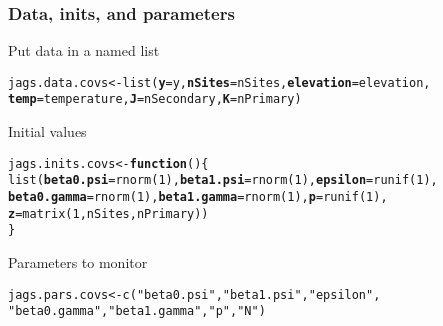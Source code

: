 \documentclass[color=usenames,dvipsnames]{beamer}\usepackage[]{graphicx}\usepackage[]{color}
\makeatletter
\newcommand{\hlnum}[1]{\textcolor[rgb]{0.69,0.494,0}{#1}}%
\newcommand{\hlstr}[1]{\textcolor[rgb]{0.749,0.012,0.012}{#1}}%
\newcommand{\hlstd}[1]{\textcolor[rgb]{0,0,0}{#1}}%
\newcommand{\hlkwa}[1]{\textcolor[rgb]{0,0,0}{\textbf{#1}}}%
\newcommand{\hlkwb}[1]{\textcolor[rgb]{0,0.341,0.682}{#1}}%
\newcommand{\hlkwc}[1]{\textcolor[rgb]{0,0,0}{\textbf{#1}}}%
\newcommand{\hlkwd}[1]{\textcolor[rgb]{0.004,0.004,0.506}{#1}}%
\newenvironment{kframe}{%
 \def\at@end@of@kframe{}%
 \ifinner\ifhmode%
  \def\at@end@of@kframe{\end{minipage}}%
  \begin{minipage}{\columnwidth}%
 \fi\fi%
 \def\FrameCommand##1{\hskip\@totalleftmargin \hskip-\fboxsep
 \colorbox{shadecolor}{##1}\hskip-\fboxsep
     \hskip-\linewidth \hskip-\@totalleftmargin \hskip\columnwidth}%
 \MakeFramed {\advance\hsize-\width
   \@totalleftmargin\z@ \linewidth\hsize
   \@setminipage}}%
 {\par\unskip\endMakeFramed%
 \at@end@of@kframe}
\newenvironment{knitrout}{}{} %
\makeatother
\begin{document}
\begin{frame}[fragile]
  \frametitle{Data, inits, and parameters}
  Put data in a named list
  \vspace{-12pt}
\begin{knitrout}\small
{}\color{fgcolor}\begin{kframe}
\begin{alltt}
\hlstd{jags.data.covs} \hlkwb{<-} \hlkwd{list}\hlstd{(}\hlkwc{y}\hlstd{=y,} \hlkwc{nSites}\hlstd{=nSites,} \hlkwc{elevation}\hlstd{=elevation,}
                       \hlkwc{temp}\hlstd{=temperature,} \hlkwc{J}\hlstd{=nSecondary,} \hlkwc{K}\hlstd{=nPrimary)}
\end{alltt}
\end{kframe}
\end{knitrout}
\pause
\vfill
  Initial values
  \vspace{-12pt}
\begin{knitrout}\small
{}\color{fgcolor}\begin{kframe}
\begin{alltt}
\hlstd{jags.inits.covs} \hlkwb{<-} \hlkwa{function}\hlstd{() \{}
    \hlkwd{list}\hlstd{(}\hlkwc{beta0.psi}\hlstd{=}\hlkwd{rnorm}\hlstd{(}\hlnum{1}\hlstd{),} \hlkwc{beta1.psi}\hlstd{=}\hlkwd{rnorm}\hlstd{(}\hlnum{1}\hlstd{),} \hlkwc{epsilon}\hlstd{=}\hlkwd{runif}\hlstd{(}\hlnum{1}\hlstd{),}
         \hlkwc{beta0.gamma}\hlstd{=}\hlkwd{rnorm}\hlstd{(}\hlnum{1}\hlstd{),} \hlkwc{beta1.gamma}\hlstd{=}\hlkwd{rnorm}\hlstd{(}\hlnum{1}\hlstd{),} \hlkwc{p}\hlstd{=}\hlkwd{runif}\hlstd{(}\hlnum{1}\hlstd{),}
         \hlkwc{z}\hlstd{=}\hlkwd{matrix}\hlstd{(}\hlnum{1}\hlstd{, nSites, nPrimary))}
\hlstd{\}}
\end{alltt}
\end{kframe}
\end{knitrout}
\pause
\vfill
  Parameters to monitor
  \vspace{-12pt}
\begin{knitrout}\small
{}\color{fgcolor}\begin{kframe}
\begin{alltt}
\hlstd{jags.pars.covs} \hlkwb{<-} \hlkwd{c}\hlstd{(}\hlstr{"beta0.psi"}\hlstd{,} \hlstr{"beta1.psi"}\hlstd{,} \hlstr{"epsilon"}\hlstd{,}
                    \hlstr{"beta0.gamma"}\hlstd{,} \hlstr{"beta1.gamma"}\hlstd{,} \hlstr{"p"}\hlstd{,} \hlstr{"N"}\hlstd{)}
\end{alltt}
\end{kframe}
\end{knitrout}
\end{frame}
\end{document}
